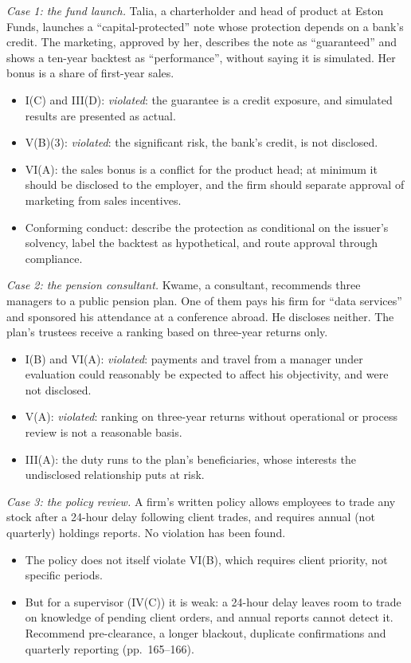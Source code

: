 \begin{qfmethod}
\emph{Case 1: the fund launch.} Talia, a charterholder and head of product at Eston Funds, launches a ``capital-protected'' note whose protection depends on a bank's credit. The marketing, approved by her, describes the note as ``guaranteed'' and shows a ten-year backtest as ``performance'', without saying it is simulated. Her bonus is a share of first-year sales.
\begin{itemize}
\item I(C) and III(D): \emph{violated}: the guarantee is a credit exposure, and simulated results are presented as actual.
\item V(B)(3): \emph{violated}: the significant risk, the bank's credit, is not disclosed.
\item VI(A): the sales bonus is a conflict for the product head; at minimum it should be disclosed to the employer, and the firm should separate approval of marketing from sales incentives.
\item Conforming conduct: describe the protection as conditional on the issuer's solvency, label the backtest as hypothetical, and route approval through compliance.
\end{itemize}

\emph{Case 2: the pension consultant.} Kwame, a consultant, recommends three managers to a public pension plan. One of them pays his firm for ``data services'' and sponsored his attendance at a conference abroad. He discloses neither. The plan's trustees receive a ranking based on three-year returns only.
\begin{itemize}
\item I(B) and VI(A): \emph{violated}: payments and travel from a manager under evaluation could reasonably be expected to affect his objectivity, and were not disclosed.
\item V(A): \emph{violated}: ranking on three-year returns without operational or process review is not a reasonable basis.
\item III(A): the duty runs to the plan's beneficiaries, whose interests the undisclosed relationship puts at risk.
\end{itemize}

\emph{Case 3: the policy review.} A firm's written policy allows employees to trade any stock after a 24-hour delay following client trades, and requires annual (not quarterly) holdings reports. No violation has been found.
\begin{itemize}
\item The policy does not itself violate VI(B), which requires client priority, not specific periods.
\item But for a supervisor (IV(C)) it is weak: a 24-hour delay leaves room to trade on knowledge of pending client orders, and annual reports cannot detect it. Recommend pre-clearance, a longer blackout, duplicate confirmations and quarterly reporting (pp.~165--166).
\end{itemize}


\end{qfmethod}
